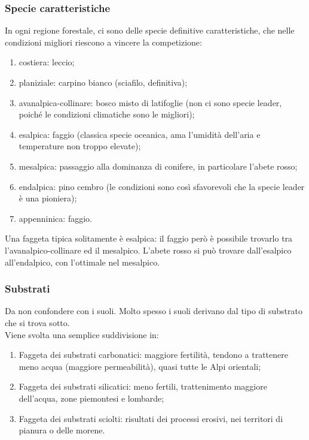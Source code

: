 \subsubsection{Specie caratteristiche}
In ogni regione forestale, ci sono delle specie definitive caratteristiche, che nelle condizioni migliori riescono a vincere la competizione:
\begin{enumerate}[nosep]
    \item costiera: leccio;
    \item planiziale: carpino bianco (sciafilo, definitiva);
    \item avanalpica-collinare: bosco misto di latifoglie (non ci sono specie leader, poiché le condizioni climatiche sono le migliori);
    \item esalpica: faggio (classica specie oceanica, ama l'umidità dell'aria e temperature non troppo elevate);
    \item mesalpica: passaggio alla dominanza di conifere, in particolare l'abete rosso;
    \item endalpica: pino cembro (le condizioni sono così sfavorevoli che la specie leader è una pioniera);
    \item appenninica: faggio.
\end{enumerate}
Una faggeta tipica solitamente è esalpica: il faggio però è possibile trovarlo tra l'avanalpico-collinare ed il mesalpico. L'abete rosso si può trovare dall'esalpico all'endalpico, con l'ottimale nel mesalpico. 
\subsubsection{Substrati}
Da non confondere con i suoli. Molto spesso i suoli derivano dal tipo di substrato che si trova sotto.\\
Viene svolta una semplice suddivisione in:
\begin{enumerate}[nosep]
    \item Faggeta dei substrati carbonatici: maggiore fertilità, tendono a trattenere meno acqua (maggiore permeabilità), quasi tutte le Alpi orientali;
    \item Faggeta dei substrati silicatici: meno fertili, trattenimento maggiore dell'acqua, zone piemontesi e lombarde;
    \item Faggeta dei substrati sciolti: risultati dei processi erosivi, nei territori di pianura o delle morene.
\end{enumerate}
